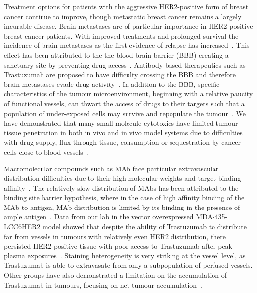 Treatment options for patients with the aggressive \acs{HER2}-positive form of breast cancer continue to improve, though metastatic breast cancer remains a largely incurable disease.
Brain metastases are of particular importance in \acs{HER2}-positive breast cancer patients.
With improved treatments and prolonged survival the incidence of brain metastases as the first evidence of relapse has increased~\cite{Seal:2012cn,Bria:2007gc}.
This effect has been attributed to the the blood-brain barrier (\acs{BBB}) creating a sanctuary site by preventing drug access~\cite{Kaplan:2014es,Lai:2004bd}.
Antibody-based therapeutics such as Trastuzumab are proposed to have difficulty crossing the \acs{BBB} and therefore brain metastases evade drug activity~\cite{Seal:2012cn,Murrell:2015bz,Stemmler:2006}.
In addition to the \acs{BBB}, specific characteristics of the tumour microenvironment, beginning with a relative paucity of functional vessels, can thwart the access of drugs to their targets such that a population of under-exposed cells may survive and repopulate the tumour~\cite{Minchinton:2006gs}.
We have demonstrated that many small molecule cytotoxics have limited tumour tissue penetration in both in vivo and in vivo model systems due to difficulties with drug supply, flux through tissue, consumption or sequestration by cancer cells close to blood vessels~\cite{Kyle:2014cy,Kyle:2007ch,Huxham:2004hm,Kyle:2004fo,Kyle:1999kr}.

Macromolecular compounds such as \acs{MAb} face particular extravascular distribution difficulties due to their high molecular weights and target-binding affinity~\cite{Jain:2010ie,Chauhan:2011fi}.
The relatively slow distribution of \acs{MAbs} has been attributed to the binding site barrier hypothesis, where in the case of high affinity binding of the \acs{MAb} to antigen, \acs{MAb} distribution is limited by its binding in the presence of ample antigen~\cite{Juweid:1992ty}.
Data from our lab in the vector overexpressed MDA-435-LCC6\acs{HER2} model showed that despite the ability of Trastuzumab to distribute far from vessels in tumours with relatively even \acs{HER2} distribution, there persisted \acs{HER2}-positive tissue with poor access to Trastuzumab after peak plasma exposures~\cite{Baker:2008ci}.
Staining heterogeneity is very striking at the vessel level, as Trastuzumab is able to extravasate from only a subpopulation of perfused vessels.
Other groups have also demonstrated a limitation on the accumulation of Trastuzumab in tumours, focusing on net tumour accumulation~\cite{Jain:2010ie,Chauhan:2011fi,Lee:2010gb}.

